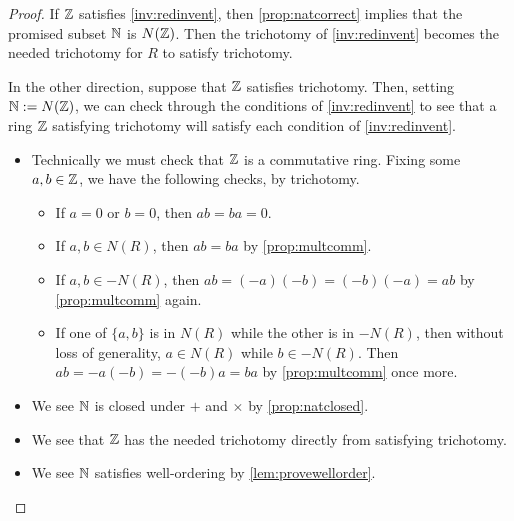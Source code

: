 \documentclass{article}
\begin{document}
\begin{proof}
	If $\mathbb Z$ satisfies \autoref{inv:redinvent}, then \autoref{prop:natcorrect} implies that the promised subset $\mathbb N$ is $N(\mathbb Z)$. Then the trichotomy of \autoref{inv:redinvent} becomes the needed trichotomy for $R$ to satisfy trichotomy.

	In the other direction, suppose that $\mathbb Z$ satisfies trichotomy. Then, setting $\mathbb N:=N(\mathbb Z)$, we can check through the conditions of \autoref{inv:redinvent} to see that a ring $\mathbb Z$ satisfying trichotomy will satisfy each condition of \autoref{inv:redinvent}.
	\begin{itemize}
		\item Technically we must check that $\mathbb Z$ is a commutative ring. Fixing some $a,b\in\mathbb Z$, we have the following checks, by trichotomy.
		\begin{itemize}
			\item If $a=0$ or $b=0$, then $ab=ba=0$.
			\item If $a,b\in N(R)$, then $ab=ba$ by \autoref{prop:multcomm}.
			\item If $a,b\in-N(R)$, then $ab=(-a)(-b)=(-b)(-a)=ab$ by \autoref{prop:multcomm} again.
			\item If one of $\{a,b\}$ is in $N(R)$ while the other is in $-N(R)$, then without loss of generality, $a\in N(R)$ while $b\in-N(R)$. Then $ab=-a(-b)=-(-b)a=ba$ by \autoref{prop:multcomm} once more.
		\end{itemize}
		\item We see $\mathbb N$ is closed under $+$ and $\times$ by \autoref{prop:natclosed}.
		\item We see that $\mathbb Z$ has the needed trichotomy directly from satisfying trichotomy.
		\item We see $\mathbb N$ satisfies well-ordering by \autoref{lem:provewellorder}.
		\qedhere
	\end{itemize}
\end{proof}
\end{document}
